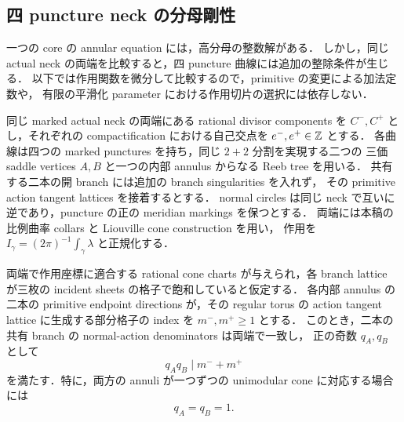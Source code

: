 
\subsection{四 puncture neck の分母剛性}
\label{q9:four-puncture-section}

一つの core の annular equation には，高分母の整数解がある．
しかし，同じ actual neck の両端を比較すると，四 puncture 曲線には追加の整除条件が生じる．
以下では作用関数を微分して比較するので，primitive の変更による加法定数や，
有限の平滑化 parameter における作用切片の選択には依存しない．

\begin{proposition}
\label{q9:four-puncture-divisibility}
\label{q9:rigidity}
同じ marked actual neck の両端にある rational divisor components を
$C^-,C^+$ とし，それぞれの compactification における自己交点を $e^-,e^+\in\mathbb Z$ とする．
各曲線は四つの marked punctures を持ち，同じ $2+2$ 分割を実現する二つの
三価 saddle vertices $A,B$ と一つの内部 annulus からなる Reeb tree を用いる．
共有する二本の開 branch には追加の branch singularities を入れず，
その primitive action tangent lattices を接着するとする．
normal circles は同じ neck で互いに逆であり，puncture の正の meridian markings を保つとする．
両端には本稿の比例曲率 collars と Liouville cone construction を用い，
作用を $I_\gamma=(2\pi)^{-1}\int_\gamma\lambda$ と正規化する．

両端で作用座標に適合する rational cone charts が与えられ，各 branch lattice が三枚の
incident sheets の格子で飽和していると仮定する．
各内部 annulus の二本の primitive endpoint directions が，その regular torus の
action tangent lattice に生成する部分格子の index を $m^-,m^+\geq1$ とする．
このとき，二本の共有 branch の normal-action denominators は両端で一致し，
正の奇数 $q_A,q_B$ として
\begin{equation}\label{q9:cone-index-divisibility}
 q_Aq_B\mid m^-+m^+
\end{equation}
を満たす．特に，両方の annuli が一つずつの unimodular cone に対応する場合には
\begin{equation}\label{q9:four-puncture-q-one}
 q_A=q_B=1.
\end{equation}
\end{proposition}

